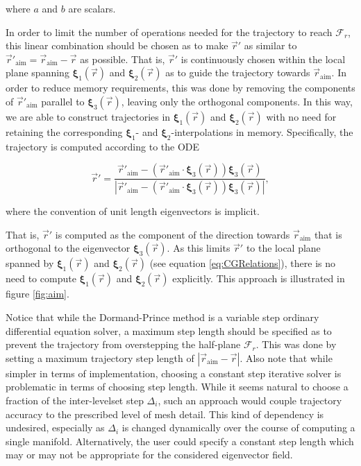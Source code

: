 \noindent where $a$ and $b$ are scalars.
 
In order to limit the number of operations needed for the trajectory to reach $\mathcal{F}_r$, this linear combination should be chosen as to make $\vec{r}'$ as similar to $ \vec{r}'_{\text{aim}} = \vec{r}_{\text{aim}} - \vec{r}$ as possible. That is, $\vec{r}'$ is continuously chosen within the local plane spanning $\bm{\xi}_1(\vec{r})$ and $\bm{\xi}_2(\vec{r})$ as to guide the trajectory towards $\vec{r}_{\text{aim}}$. In order to reduce memory requirements, this was done by removing the components of $\vec{r}'_{\text{aim}}$ parallel to $\bm{\xi}_3(\vec{r})$, leaving only the orthogonal components. In this way, we are able to construct trajectories in $\bm{\xi}_1(\vec{r})$ and $\bm{\xi}_2(\vec{r})$ with no need for retaining the corresponding $\bm{\xi}_1$- and $\bm{\xi}_2$-interpolations in memory. Specifically, the trajectory is computed according to the ODE

\begin{equation}\label{eq:aim_orthogonal}
\vec{r}' = \frac{\vec{r}'_{\text{aim}} - \left( \vec{r}'_{\text{aim}} \cdot \bm{\xi}_3(\vec{r})\right)\bm{\xi}_3(\vec{r})}{\left| \vec{r}'_{\text{aim}} - \left( \vec{r}'_{\text{aim}} \cdot \bm{\xi}_3(\vec{r})\right)\bm{\xi}_3(\vec{r})\right|},
\end{equation}

\noindent where the convention of unit length eigenvectors is implicit.

That is, $\vec{r}'$ is computed as the component of the direction towards $\vec{r}_{\text{aim}}$ that is orthogonal to the eigenvector $\bm{\xi}_3(\vec{r})$. As this limits $\vec{r}'$ to the local plane spanned by $\bm{\xi}_1(\vec{r})$ and $\bm{\xi}_2(\vec{r})$ (see equation \eqref{eq:CGRelations}), there is no need to compute $\bm{\xi}_1(\vec{r})$ and $\bm{\xi}_2(\vec{r})$ explicitly. This approach is illustrated in figure \ref{fig:aim}. 

Notice that while the Dormand-Prince method is a variable step ordinary differential equation solver, a maximum step length should be specified as to prevent the trajectory from overstepping the half-plane $\mathcal{F}_r$. This was done by setting a maximum trajectory step length of $ \left| \vec{r}_{\text{aim}} - \vec{r}\right|$. Also note that while simpler in terms of implementation, choosing a constant step iterative solver is problematic in terms of choosing step length. While it seems natural to choose a fraction of the inter-levelset step $\Delta_i$, such an approach would couple trajectory accuracy to the prescribed level of mesh detail. This kind of dependency is undesired, especially as $\Delta_i$ is changed dynamically over the course of computing a single manifold. Alternatively, the user could specify a constant step length which may or may not be appropriate for the considered eigenvector field.

